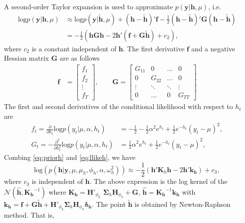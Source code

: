 \documentclass[11pt]{article}
\newcommand{\beq}{\begin{equation}}
\newcommand{\eeq}{\end{equation}}
\newcommand{\bbmatrix}{\begin{bmatrix}}
\newcommand{\ebmatrix}{\end{bmatrix}}
\numberwithin{equation}{section}
\begin{document}
A second-order Taylor expansion is used to approximate $p(\mathbf{y}|\mathbf{h}, \mu)$, i.e.
\begin{align}
\text{log}p(\mathbf{y}|\mathbf{h}, \mu) &\approx \text{log}p(\mathbf{y}|\mathbf{\tilde{h}}, \mu) +(\mathbf{h}-\mathbf{\tilde{h}})'\mathbf{f} -\frac{1}{2}(\mathbf{h}-\mathbf{\tilde{h}})'\mathbf{G}(\mathbf{h}-\mathbf{\tilde{h}})\\
&=-\frac{1}{2}(\mathbf{h}\mathbf{G}\mathbf{h}-2\mathbf{h}'(\mathbf{f}+\mathbf{G}\mathbf{\tilde{h}})+c_2), \label{eq:llikeh}
\end{align}
where $c_2$ is a constant independent of $\mathbf{h}$. The first derivative $\mathbf{f}$ and a negative Hessian matrix $\mathbf{G}$ are as follows 
\begin{align*}
\mathbf{f}&=\bbmatrix f_1 \\ f_2 \\ \vdots \\f_{T} \ebmatrix, \qquad \mathbf{G} =\bbmatrix
G_{11} & 0 & \ldots & 0 \\
0 & G_{22} & \ldots  & 0 \\
\vdots & \ddots & \ddots& \vdots \\
0 & \ldots & 0 & G_{TT}
\ebmatrix
\end{align*}
The first and second derivatives of the conditional likelihood with respect to $h_t$ are
\begin{align*}
f_t=\frac{\partial}{\partial h_t} \text{log}p(y_t|\mu, \alpha, h_t) & = -\frac{1}{2}-\frac{1}{2} \alpha^2 e^{h_t}+\frac{1}{2}e^{-h_t}(y_t -\mu)^2, \\
G_t=-\frac{\partial^2}{\partial h^2_t} \text{log}p(y_t|\mu, \alpha, h_t) & = \frac{1}{2}\alpha^2 e^{h_t}+\frac{1}{2}e^{-h_t}(y_t -\mu)^2,
\end{align*}
Combing \eqref{eq:priorh} and \eqref{eq:llikeh}, we have
\beq
\text{log}(p(\mathbf{h}|\mathbf{y}, \mu, \mu_h, \phi_h, \alpha, \omega^2_h)) \approx -\frac{1}{2}(\mathbf{h}'\mathbf{K}_h\mathbf{h} -2\mathbf{h}'\mathbf{k_h})+c_3,
\eeq
where $c_3$ is independent of $\mathbf{h}$. The above expression is the log kernel of the $\mathcal{N}(\hat{\mathbf{h}}, \mathbf{K_h}^{-1})$ where $\mathbf{K_h}=\mathbf{H}'_{\phi_h}$ $\mathbf{\Sigma}_h \mathbf{H}_{\phi_h} +\mathbf{G}$, $\hat{\mathbf{h}}=\mathbf{K_h}^{-1}\mathbf{k_h}$ with  $\mathbf{k_h}=\mathbf{f}+\mathbf{G}\mathbf{\tilde{h}}+\mathbf{H}'_{\phi_h} \mathbf{\Sigma}_h \mathbf{H}_{\phi_h} \pmb{\delta_h}$. The point   $\mathbf{\tilde{h}}$ is obtained by Newton-Raphson method. That is,
 
\end{document}
